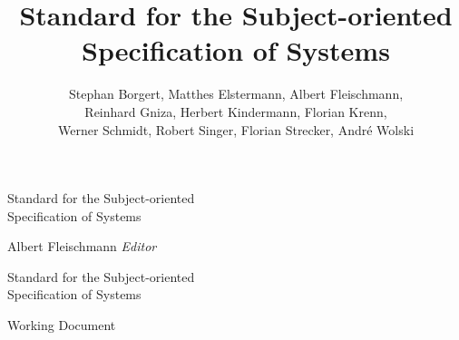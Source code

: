 \documentclass[11pt, showtrims, final]{memoir}
\title{Standard for the Subject-oriented\\ Specification of Systems}
\author{Stephan Borgert, Matthes Elstermann, Albert Fleischmann, \\ Reinhard Gniza, Herbert Kindermann, Florian Krenn,\\ Werner Schmidt, Robert Singer, Florian Strecker, André Wolski}
\begin{document}

\frontmatter

\pagestyle{empty}

\vspace*{3cm}
\begin{adjustwidth}{0cm}{-3cm}
	\begin{flushright}
		\LARGE\textsf Standard for the Subject-oriented\\Specification of Systems
	\end{flushright}
\end{adjustwidth}
\vspace*{\fill}
\cleardoublepage

\vspace*{0cm}
\begin{flushleft}
	\Large\textsf{Albert Fleischmann \textit{Editor}}\par
\end{flushleft}
\vspace{2cm}
\begin{flushleft}
	\Huge\textsf{Standard for the Subject-oriented\\Specification of Systems}\par
	\bigskip\bigskip
	\Large\textsf{Working Document}
\end{flushleft}
\vspace{2.5cm}
\begin{flushleft}
\end{flushleft}
\vspace*{\fill}
\clearpage
\end{document}

